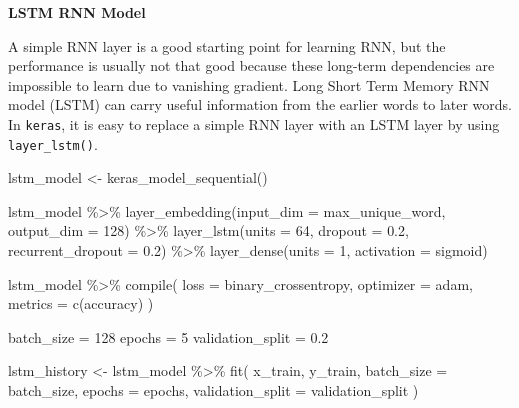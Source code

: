 \documentclass[
  12pt,
]{krantz}
\makeatletter
\newenvironment{Shaded}{\begin{snugshade}}{\end{snugshade}}
\newcommand{\AttributeTok}[1]{\textcolor[rgb]{0.61,0.61,0.61}{#1}}
\newcommand{\DecValTok}[1]{\textcolor[rgb]{0.06,0.06,0.06}{#1}}
\newcommand{\FloatTok}[1]{\textcolor[rgb]{0.06,0.06,0.06}{#1}}
\newcommand{\FunctionTok}[1]{\textcolor[rgb]{0,0,0}{#1}}
\newcommand{\NormalTok}[1]{#1}
\newcommand{\OtherTok}[1]{\textcolor[rgb]{0.37,0.37,0.37}{#1}}
\newcommand{\SpecialCharTok}[1]{\textcolor[rgb]{0,0,0}{#1}}
\newcommand{\StringTok}[1]{\textcolor[rgb]{0.5,0.5,0.5}{#1}}
\newenvironment{kframe}{%
\medskip{}
\setlength{\fboxsep}{.8em}
 \def\at@end@of@kframe{}%
 \ifinner\ifhmode%
  \def\at@end@of@kframe{\end{minipage}}%
  \begin{minipage}{\columnwidth}%
 \fi\fi%
 \def\FrameCommand##1{\hskip\@totalleftmargin \hskip-\fboxsep
 \colorbox{shadecolor}{##1}\hskip-\fboxsep
     \hskip-\linewidth \hskip-\@totalleftmargin \hskip\columnwidth}%
 \MakeFramed {\advance\hsize-\width
   \@totalleftmargin\z@ \linewidth\hsize
   \@setminipage}}%
 {\par\unskip\endMakeFramed%
 \at@end@of@kframe}
\renewenvironment{Shaded}{\begin{kframe}}{\end{kframe}}
\makeatother
\begin{document}
\textbf{LSTM RNN Model}

A simple RNN layer is a good starting point for learning RNN, but the performance is usually not that good because these long-term dependencies are impossible to learn due to vanishing gradient. Long Short Term Memory RNN model (LSTM) can carry useful information from the earlier words to later words. In \texttt{keras}, it is easy to replace a simple RNN layer with an LSTM layer by using \texttt{layer\_lstm()}.

\begin{Shaded}
\begin{Highlighting}[]
\NormalTok{lstm\_model }\OtherTok{\textless{}{-}} \FunctionTok{keras\_model\_sequential}\NormalTok{()}

\NormalTok{lstm\_model }\SpecialCharTok{\%\textgreater{}\%}
  \FunctionTok{layer\_embedding}\NormalTok{(}\AttributeTok{input\_dim =}\NormalTok{ max\_unique\_word, }\AttributeTok{output\_dim =} \DecValTok{128}\NormalTok{) }\SpecialCharTok{\%\textgreater{}\%} 
  \FunctionTok{layer\_lstm}\NormalTok{(}\AttributeTok{units =} \DecValTok{64}\NormalTok{, }\AttributeTok{dropout =} \FloatTok{0.2}\NormalTok{, }\AttributeTok{recurrent\_dropout =} \FloatTok{0.2}\NormalTok{) }\SpecialCharTok{\%\textgreater{}\%} 
  \FunctionTok{layer\_dense}\NormalTok{(}\AttributeTok{units =} \DecValTok{1}\NormalTok{, }\AttributeTok{activation =} \StringTok{\textquotesingle{}sigmoid\textquotesingle{}}\NormalTok{)}

\NormalTok{lstm\_model }\SpecialCharTok{\%\textgreater{}\%} \FunctionTok{compile}\NormalTok{(}
  \AttributeTok{loss =} \StringTok{\textquotesingle{}binary\_crossentropy\textquotesingle{}}\NormalTok{,}
  \AttributeTok{optimizer =} \StringTok{\textquotesingle{}adam\textquotesingle{}}\NormalTok{,}
  \AttributeTok{metrics =} \FunctionTok{c}\NormalTok{(}\StringTok{\textquotesingle{}accuracy\textquotesingle{}}\NormalTok{)}
\NormalTok{)}

\NormalTok{batch\_size }\OtherTok{=} \DecValTok{128}
\NormalTok{epochs }\OtherTok{=} \DecValTok{5}
\NormalTok{validation\_split }\OtherTok{=} \FloatTok{0.2}

\NormalTok{lstm\_history }\OtherTok{\textless{}{-}}\NormalTok{ lstm\_model }\SpecialCharTok{\%\textgreater{}\%} \FunctionTok{fit}\NormalTok{(}
\NormalTok{  x\_train, y\_train,}
  \AttributeTok{batch\_size =}\NormalTok{ batch\_size,}
  \AttributeTok{epochs =}\NormalTok{ epochs,}
  \AttributeTok{validation\_split =}\NormalTok{ validation\_split}
\NormalTok{)}
\end{Highlighting}
\end{Shaded}
\end{document}
